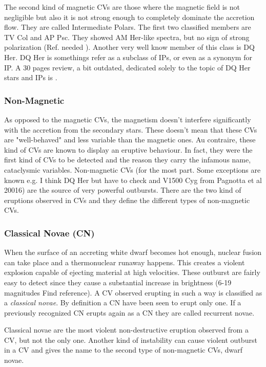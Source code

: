 The second kind of magnetic CVs are those where the magnetic field is not negligible but also it is not strong enough to completely dominate the accretion flow. They are called Intermediate Polars. The first two classified members are TV Col and AP Psc. They showed AM Her-like spectra, but no sign of strong polarization (Ref. needed \cite{ref}). Another very well know member of this class is DQ Her. DQ Her is somethings refer as a subclass of IPs, or even as a synonym for IP. A 30 pages review, a bit outdated, dedicated solely to the topic of DQ Her stars and IPs is \cite{patterson_dq_1994}.  


\subsubsection{Non-Magnetic}

As opposed to the magnetic CVs, the magnetism doesn't interfere significantly with the accretion from the secondary stars. These doesn't mean that these CVs are "well-behaved" and less variable than the magnetic ones. Au contraire, these kind of CVs are known to display an eruptive behaviour. In fact, they were the first kind of CVs to be detected and the reason they carry the infamous name, cataclysmic variables. Non-magnetic CVs (for the most part. Some exceptions are known e.g. \cite{a} I think DQ Her but have to check and  V1500 Cyg from Pagnotta et al 20016) are the source of very powerful outbursts. There are the two kind of eruptions observed in CVs and they define the different types of non-magnetic CVs. %


\subsubsection{Classical Novae (CN)}

When the surface of an accreting white dwarf becomes hot enough, nuclear fusion can take place and a thermonuclear runaway happens. This creates a violent explosion capable of ejecting material at high velocities. These outburst are fairly easy to detect since they cause a substantial increase in brightness (6-19 magnitudes \cite{a} Find reference). A CV observed erupting in such a way is classified as a \emph{classical novae}. By definition a CN have been seen to erupt only one. If a previously recognized CN erupts again as a CN they are called recurrent novae. 

Classical novae are the most violent non-destructive eruption observed from a CV, but not the only one. Another kind of instability can cause violent outburst in a CV and gives the name to the second type of non-magnetic CVs, dwarf novae. 


